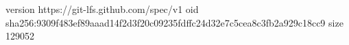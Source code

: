 version https://git-lfs.github.com/spec/v1
oid sha256:9309f483ef89aaad14f2d3f20c09235fdffc24d32e7c5cea8c3fb2a929c18cc9
size 129052
